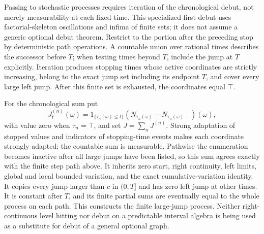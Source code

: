 Passing to stochastic processes requires iteration of the chronological
debut, not merely measurability at each fixed time. This specialized first
debut uses factorial-skeleton oscillations and infima of finite sets;
it does not assume a generic optional debut theorem. Restrict to the portion
after the preceding stop by deterministic path operations. A countable
union over rational times describes the successor before $T$; when testing
times beyond $T$, include the jump at $T$ explicitly. Iteration produces
stopping times whose active coordinates are strictly increasing, belong
to the exact jump set including its endpoint $T$, and cover every large
left jump. After this finite set is exhausted, the coordinates equal $\top$.

For the chronological sum put
\[
 J^{(n)}_t(\omega)=1_{\{\tau_n(\omega)\leq t\}}
 (N_{\tau_n(\omega)}-N_{\tau_n(\omega)-})(\omega),
\]
with value zero when $\tau_n=\top$, and set $J=\sum_nJ^{(n)}$.
Strong adaptation of stopped values and indicators of stopping-time events
makes each coordinate strongly adapted; the countable sum is measurable.
Pathwise the enumeration becomes inactive after all large jumps have been
listed, so this sum agrees exactly with the finite step path above.
It inherits zero start, right continuity, left limits, global and local
bounded variation, and the exact cumulative-variation identity.
It copies every jump larger than $c$ in $(0,T]$ and has zero left jump at
other times. It is constant after $T$, and its finite partial sums are
eventually equal to the whole process on each path.
This constructs the finite large-jump process. Neither right-continuous
level hitting nor debut on a predictable interval algebra is being used
as a substitute for debut of a general optional graph.
